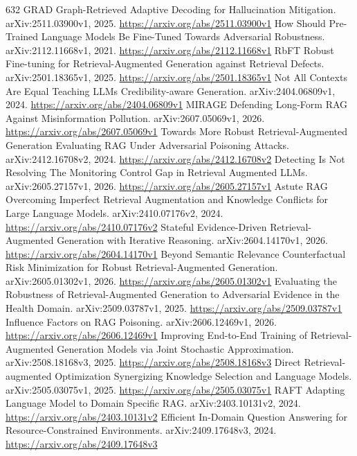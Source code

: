 \documentclass[11pt]{article}
\begin{document}
\begin{thebibliography}{632}
 GRAD Graph-Retrieved Adaptive Decoding for Hallucination Mitigation. arXiv:2511.03900v1, 2025. \url{https://arxiv.org/abs/2511.03900v1}
 How Should Pre-Trained Language Models Be Fine-Tuned Towards Adversarial Robustness. arXiv:2112.11668v1, 2021. \url{https://arxiv.org/abs/2112.11668v1}
 RbFT Robust Fine-tuning for Retrieval-Augmented Generation against Retrieval Defects. arXiv:2501.18365v1, 2025. \url{https://arxiv.org/abs/2501.18365v1}
 Not All Contexts Are Equal Teaching LLMs Credibility-aware Generation. arXiv:2404.06809v1, 2024. \url{https://arxiv.org/abs/2404.06809v1}
 MIRAGE Defending Long-Form RAG Against Misinformation Pollution. arXiv:2607.05069v1, 2026. \url{https://arxiv.org/abs/2607.05069v1}
 Towards More Robust Retrieval-Augmented Generation Evaluating RAG Under Adversarial Poisoning Attacks. arXiv:2412.16708v2, 2024. \url{https://arxiv.org/abs/2412.16708v2}
 Detecting Is Not Resolving The Monitoring Control Gap in Retrieval Augmented LLMs. arXiv:2605.27157v1, 2026. \url{https://arxiv.org/abs/2605.27157v1}
 Astute RAG Overcoming Imperfect Retrieval Augmentation and Knowledge Conflicts for Large Language Models. arXiv:2410.07176v2, 2024. \url{https://arxiv.org/abs/2410.07176v2}
 Stateful Evidence-Driven Retrieval-Augmented Generation with Iterative Reasoning. arXiv:2604.14170v1, 2026. \url{https://arxiv.org/abs/2604.14170v1}
 Beyond Semantic Relevance Counterfactual Risk Minimization for Robust Retrieval-Augmented Generation. arXiv:2605.01302v1, 2026. \url{https://arxiv.org/abs/2605.01302v1}
 Evaluating the Robustness of Retrieval-Augmented Generation to Adversarial Evidence in the Health Domain. arXiv:2509.03787v1, 2025. \url{https://arxiv.org/abs/2509.03787v1}
 Influence Factors on RAG Poisoning. arXiv:2606.12469v1, 2026. \url{https://arxiv.org/abs/2606.12469v1}
 Improving End-to-End Training of Retrieval-Augmented Generation Models via Joint Stochastic Approximation. arXiv:2508.18168v3, 2025. \url{https://arxiv.org/abs/2508.18168v3}
 Direct Retrieval-augmented Optimization Synergizing Knowledge Selection and Language Models. arXiv:2505.03075v1, 2025. \url{https://arxiv.org/abs/2505.03075v1}
 RAFT Adapting Language Model to Domain Specific RAG. arXiv:2403.10131v2, 2024. \url{https://arxiv.org/abs/2403.10131v2}
 Efficient In-Domain Question Answering for Resource-Constrained Environments. arXiv:2409.17648v3, 2024. \url{https://arxiv.org/abs/2409.17648v3}

\end{thebibliography}
\end{document}
